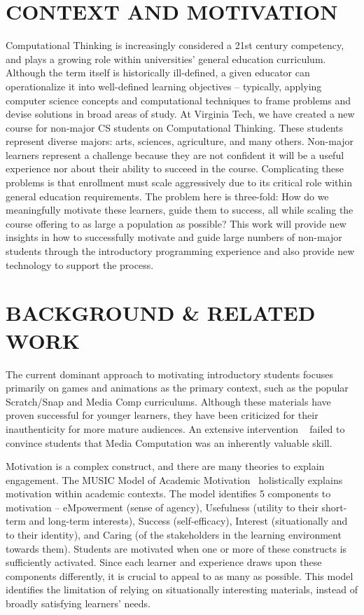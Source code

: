 \documentclass{sig-alternate}
\begin{document}
\section{CONTEXT AND MOTIVATION}
Computational Thinking is increasingly considered a 21st century competency, and plays a growing role within universities' general education curriculum.
Although the term itself is historically ill-defined, a given educator can operationalize it into well-defined learning objectives -- typically, applying computer science concepts and computational techniques to frame problems and devise solutions in broad areas of study.
At Virginia Tech, we have created a new course for non-major CS students on Computational Thinking. 
These students represent diverse majors: arts, sciences, agriculture, and many others. Non-major learners represent a challenge because they are not confident it will be a useful experience nor about their ability to succeed in the course. Complicating these problems is that enrollment must scale aggressively due to its critical role within general education requirements.
The problem here is three-fold: How do we meaningfully motivate these learners, guide them to success, all while scaling the course offering to as large a population as possible?
This work will provide new insights in how to successfully motivate and guide large numbers of non-major students through the introductory programming experience and also provide new technology to support the process. 

\section{BACKGROUND \& RELATED WORK}
The current dominant approach to motivating introductory students focuses primarily on games and animations as the primary context, such as the popular Scratch/Snap and Media Comp curriculums. Although these materials have proven successful for younger learners, they have been criticized for their inauthenticity for more mature audiences. An extensive intervention ~\cite{imagineering} failed to convince students that Media Computation was an inherently valuable skill.

Motivation is a complex construct, and there are many theories to explain engagement. The MUSIC Model of Academic Motivation~\cite{music} holistically explains motivation within academic contexts. The model identifies 5 components to motivation -- eMpowerment (sense of agency), Usefulness (utility to their short-term and long-term interests), Success (self-efficacy), Interest (situationally and to their identity), and Caring (of the stakeholders in the learning environment towards them). Students are motivated when one or more of these constructs is sufficiently activated. Since each learner and experience draws upon these components differently, it is crucial to appeal to as many as possible. This model identifies the limitation of relying on situationally interesting materials, instead of broadly satisfying learners' needs.
\end{document}

